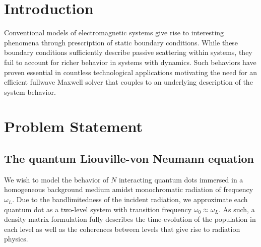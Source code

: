 \documentclass[conference]{IEEEtran}
\begin{document}
\IEEEpeerreviewmaketitle

\section{Introduction}
Conventional models of electromagnetic systems give rise to interesting phenomena through prescription of static boundary conditions.
While these boundary conditions sufficiently describe passive scattering within systems, they fail to account for richer behavior in systems with dynamics.
Such behaviors have proven essential in countless technological applications motivating the need for an efficient fullwave Maxwell solver that couples to an underlying description of the system behavior.

\section{Problem Statement}

\subsection{The quantum Liouville-von Neumann equation}
We wish to model the behavior of $N$ interacting quantum dots immersed in a homogeneous background medium amidst monochromatic radiation of frequency $\omega_L$. Due to the bandlimitedness of the incident radiation, we approximate each quantum dot as a two-level system with transition frequency $\omega_0 \approx \omega_L$.
As such, a density matrix formulation fully describes the time-evolution of the population in each level as well as the coherences between levels that give rise to radiation physics.
\end{document}
